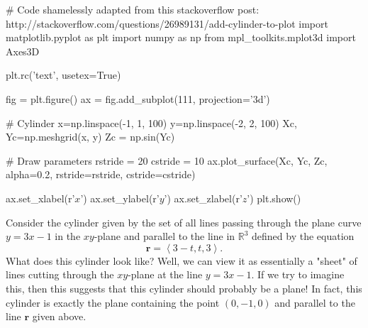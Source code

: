 \documentclass[10pt,]{book}
\theoremstyle{ptxplainnotitle}
\theoremstyle{ptxplaintitle}
\theoremstyle{ptxplainnotitle}
\theoremstyle{ptxplaintitle}
\theoremstyle{ptxplainnotitle}
\theoremstyle{ptxplaintitle}
\theoremstyle{ptxdefinitionnotitle}
\theoremstyle{ptxdefinitiontitle}
\theoremstyle{ptxdefinitionnotitle}
\theoremstyle{ptxdefinitiontitle}
\theoremstyle{ptxdefinitionnotitle}
\theoremstyle{ptxdefinitiontitle}
\theoremstyle{ptxdefinitionnotitle}
\theoremstyle{ptxdefinitiontitle}
\theoremstyle{ptxdefinitionnotitle}
\theoremstyle{ptxdefinitiontitle}
\numberwithin{equation}{section}
\newcommand{\RR}{\mathbb{R}}
\newcommand{\vv}[1]{\mathbf{#1}}
\newcommand{\dotprod}[1]{\left\langle #1 \right\rangle}
\begin{document}
\begin{sageinput}
# Code shamelessly adapted from this stackoverflow post: http://stackoverflow.com/questions/26989131/add-cylinder-to-plot
import matplotlib.pyplot as plt
import numpy as np
from mpl_toolkits.mplot3d import Axes3D

plt.rc('text', usetex=True)

fig = plt.figure()
ax = fig.add_subplot(111, projection='3d')

# Cylinder
x=np.linspace(-1, 1, 100)
y=np.linspace(-2, 2, 100)
Xc, Yc=np.meshgrid(x, y)
Zc = np.sin(Yc)

# Draw parameters
rstride = 20
cstride = 10
ax.plot_surface(Xc, Yc, Zc, alpha=0.2, rstride=rstride, cstride=cstride)

ax.set_xlabel(r'$x$')
ax.set_ylabel(r'$y$')
ax.set_zlabel(r'$z$')
plt.show()
\end{sageinput}
\begin{example}\label{example-another-cylinder}
\hypertarget{p-896}{}%
Consider the cylinder given by the set of all lines passing through the plane curve \(y = 3x-1\) in the \(xy\)-plane and parallel to the line in \(\RR^{3}\) defined by the equation%
%
\begin{equation*}
\vv{r} = \dotprod{3-t,t,3}.
\end{equation*}
\hypertarget{p-897}{}%
What does this cylinder look like? Well, we can view it as essentially a "sheet" of lines cutting through the \(xy\)-plane at the line \(y = 3x-1\). If we try to imagine this, then this suggests that this cylinder should probably be a plane! In fact, this cylinder is exactly the plane containing the point \((0,-1,0)\) and parallel to the line \(\vv{r}\) given above.%
\end{example}
\typeout{************************************************}
\typeout{************************************************}
\end{document}
